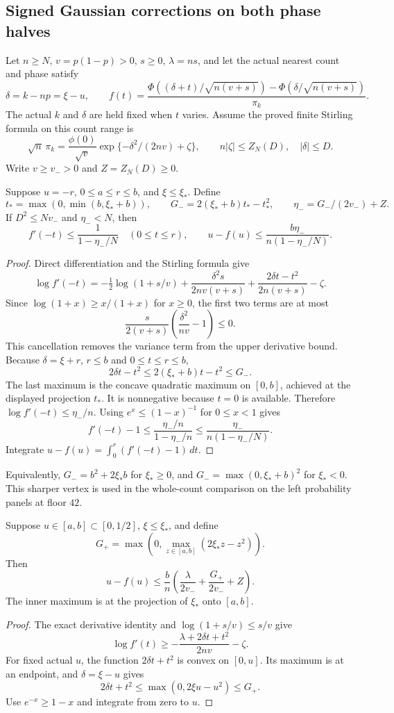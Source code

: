 \subsection{Signed Gaussian corrections on both phase halves}
Let $n\ge N$, $v=p(1-p)>0$, $s\ge0$, $\lambda=ns$, and let the
actual nearest count and phase satisfy
\[
 \delta=k-np=\xi-u,\qquad
 f(t)=\frac{\Phi((\delta+t)/\sqrt{n(v+s)})-
                   \Phi(\delta/\sqrt{n(v+s)})}{\pi_k}.
\]
The actual $k$ and $\delta$ are held fixed when $t$ varies. Assume the
proved finite Stirling formula on this count range is
\[
 \sqrt n\,\pi_k=\frac{\phi(0)}{\sqrt v}
       \exp\{-\delta^2/(2nv)+\zeta\},\qquad
 n|\zeta|\le Z_N(D),\quad |\delta|\le D.
\]
Write $v\ge v_->0$ and $Z=Z_N(D)\ge0$.

\begin{lemma}
Suppose $u=-r$, $0\le a\le r\le b$, and $\xi\le \xi_*$. Define
\[
 t_*=\max(0,\min(b,\xi_*+b)),\qquad G_-=2(\xi_*+b)t_*-t_*^2,\qquad
 \eta_-=G_-/(2v_-)+Z.
\]
If $D^2\le Nv_-$ and $\eta_-<N$, then
\[
 f'(-t)\le\frac1{1-\eta_-/N}\quad(0\le t\le r),\qquad
 u-f(u)\le\frac{b\eta_-}{n(1-\eta_-/N)}.
\]
\end{lemma}
\begin{proof}
Direct differentiation and the Stirling formula give
\[
 \log f'(-t)=-\tfrac12\log(1+s/v)
 +\frac{\delta^2s}{2nv(v+s)}
 +\frac{2\delta t-t^2}{2n(v+s)}-\zeta.
\]
Since $\log(1+x)\ge x/(1+x)$ for $x\ge0$, the first two terms are at most
\[
 \frac{s}{2(v+s)}\left(\frac{\delta^2}{nv}-1\right)\le0.
\]
This cancellation removes the variance term from the upper derivative
bound. Because $\delta=\xi+r$, $r\le b$ and $0\le t\le r\le b$,
\[
 2\delta t-t^2\le 2(\xi_*+b)t-t^2\le G_-.
\]
The last maximum is the concave quadratic maximum on $[0,b]$, achieved
at the displayed projection $t_*$. It is nonnegative because $t=0$ is
available. Therefore $\log f'(-t)\le\eta_-/n$.
Using $e^x\le(1-x)^{-1}$ for $0\le x<1$ gives
\[
 f'(-t)-1\le\frac{\eta_-/n}{1-\eta_-/n}
             \le\frac{\eta_-}{n(1-\eta_-/N)}.
\]
Integrate $u-f(u)=\int_0^r(f'(-t)-1)\,dt$.
\end{proof}

Equivalently, $G_-=b^2+2\xi_*b$ for $\xi_*\ge0$, and
$G_-=\max(0,\xi_*+b)^2$ for $\xi_*<0$. This sharper vertex is used in the
whole-count comparison on the left probability panels at floor $42$.

\begin{lemma}
Suppose $u\in[a,b]\subset[0,1/2]$, $\xi\le \xi_*$, and define
\[
 G_+=\max\left(0,\max_{z\in[a,b]}(2\xi_*z-z^2)\right).
\]
Then
\[
 u-f(u)\le\frac b n
       \left(\frac\lambda{2v_-}+\frac{G_+}{2v_-}+Z\right).
\]
The inner maximum is at the projection of $\xi_*$ onto $[a,b]$.
\end{lemma}
\begin{proof}
The exact derivative identity and $\log(1+s/v)\le s/v$ give
\[
 \log f'(t)\ge-\frac{\lambda+2\delta t+t^2}{2nv}-\zeta.
\]
For fixed actual $u$, the function $2\delta t+t^2$ is convex on $[0,u]$.
Its maximum is at an endpoint, and $\delta=\xi-u$ gives
\[
 2\delta t+t^2\le\max(0,2\xi u-u^2)\le G_+.
\]
Use $e^{-x}\ge1-x$ and integrate from zero to $u$.
\end{proof}

